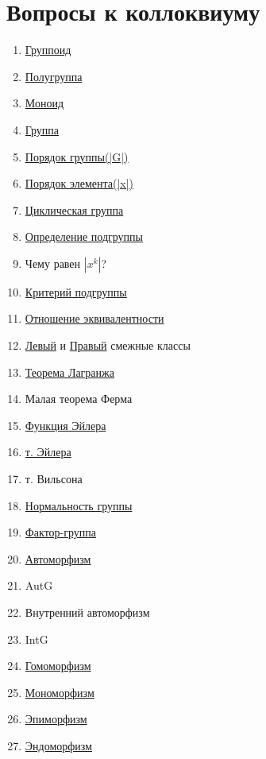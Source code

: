 \documentclass[12pt]{article}
\begin{document}
		\section{Вопросы к коллоквиуму}
				\begin{enumerate}
					\item \hyperlink{indef:gruppoid}{Группоид}
					\item \hyperlink{indef:halfgroup}{Полугруппа}
					\item \hyperlink{indef:monoid}{Моноид}
					\item \hyperlink{indef:group}{Группа}
					\item \hyperlink{indef:por_group}{Порядок группы(|G|)}
					\item \hyperlink{indef:kpor_el}{Порядок элемента(|x|)}
					\item \hyperlink{indef:circle_group}{Циклическая группа}
					\item \hyperlink{indef_subgroup}{Определение подгруппы}
					\item Чему равен $|x^k|$? 
					\item \hyperlink{th_subgroup_cri}{Критерий подгруппы}
					\item \hyperlink{indef:equiv}{Отношение эквивалентности}
					\item \hyperlink{indef:left_class}{Левый} и \hyperlink{indef:right_class}{Правый} смежные классы 
					\item \hyperlink{t_lang}{Теорема Лагранжа}
					\item Малая теорема Ферма
					\item \hyperlink{el}{Функция Эйлера}
					\item \hyperlink{el}{т. Эйлера} 
					\item т. Вильсона
					\item \hyperlink{indef:norm_gr}{Нормальность группы} 
					\item \hyperlink{indef:fact_gr}{Фактор-группа}
					\item \hyperlink{indef:morfizm}{Автоморфизм}
					\item AutG 
					\item Внутренний автоморфизм
					\item IntG
					\item \hyperlink{indef:morfizm}{Гомоморфизм}
					\item \hyperlink{indef:morfizm}{Мономорфизм}
					\item \hyperlink{indef:morfizm}{Эпиморфизм}
					\item \hyperlink{indef:morfizm}{Эндоморфизм} 

\end{enumerate}
\end{document}
